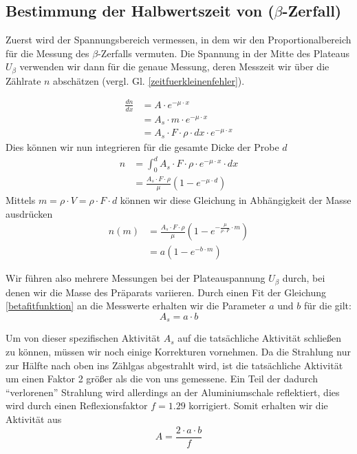 \subsection{Bestimmung der Halbwertszeit von  ($\beta$-Zerfall)}
Zuerst wird der Spannungsbereich vermessen, in dem wir den Proportionalbereich für die Messung des $\beta$-Zerfalls vermuten. Die Spannung in der Mitte des Plateaus $U_{\beta}$ verwenden wir dann für die genaue Messung, deren Messzeit wir über die Zählrate $n$ abschätzen (vergl. Gl. \ref{zeitfuerkleinenfehler}).

\begin{align}
 \frac{dn}{dx} & = A \cdot e^{- \mu \cdot x} \\
               &  = A_s \cdot m \cdot  e^{- \mu \cdot x} \\
               &  = A_s \cdot F \cdot \rho \cdot dx \cdot  e^{- \mu \cdot x}
\end{align}
Dies können wir nun integrieren für die gesamte Dicke der Probe $d$
\begin{align}
 n & = \int_0^d A_s \cdot F \cdot \rho \cdot e^{-\mu \cdot x} \cdot dx \\
   & = \frac{A_s \cdot F \cdot \rho}{\mu} \left( 1 - e^{-\mu \cdot d} \right)
\end{align}
Mittels $m = \rho \cdot V = \rho \cdot F \cdot d$ können wir diese Gleichung in Abhängigkeit der Masse ausdrücken
\begin{align}
 n \left( m \right) & = \frac{A_s \cdot F \cdot \rho}{\mu} \left( 1 - e^{- \frac{\mu}{\rho \cdot F} \cdot m} \right) \\
		    & = a \left( 1 - e^{- b \cdot m} \right) \label{betafitfunktion}
\end{align}

Wir führen also mehrere Messungen bei der Plateauspannung $U_{\beta}$ durch, bei denen wir die Masse des Präparats variieren. Durch einen Fit der Gleichung \ref{betafitfunktion} an die Messwerte erhalten wir die Parameter $a$ und $b$ für die gilt:
\begin{equation}
 A_s = a \cdot b
\end{equation}

Um von dieser spezifischen Aktivität $A_s$ auf die tatsächliche Aktivität schließen zu können, müssen wir noch einige Korrekturen vornehmen. Da die Strahlung nur zur Hälfte nach oben ins Zählgas abgestrahlt wird, ist die tatsächliche Aktivität um einen Faktor 2 größer als die von uns gemessene. Ein Teil der dadurch "`verlorenen"' Strahlung wird allerdings an der Aluminiumschale reflektiert, dies wird durch einen Reflexionsfaktor $f = 1.29$ korrigiert. Somit erhalten wir die Aktivität aus
\begin{equation}
 A = \frac{2 \cdot a \cdot b}{f}
\end{equation}

